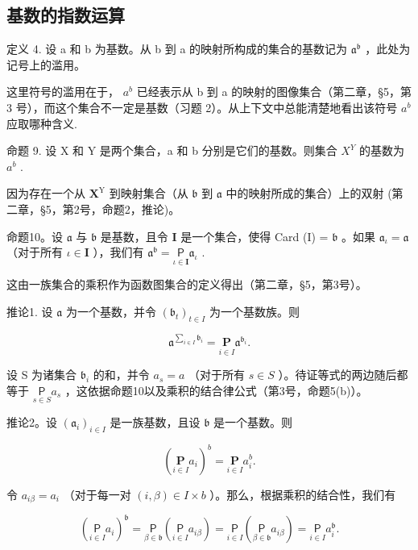 \subsection{基数的指数运算}

定义 4. 设 a 和 b 为基数。从 b 到 a 的映射所构成的集合的基数记为 \(\mathfrak{a}^{\mathfrak{b}}\) ，此处为记号上的滥用。

这里符号的滥用在于， \(a^{b}\) 已经表示从 b 到 a 的映射的图像集合（第二章，§5，第 3 号），而这个集合不一定是基数（习题 2）。从上下文中总能清楚地看出该符号 \(a^{b}\) 应取哪种含义.

命题 9. 设 X 和 Y 是两个集合，a 和 b 分别是它们的基数。则集合 \(X^{Y}\) 的基数为 \(a^{b}\) .

因为存在一个从 \(\mathbf{X}^{\mathrm{Y}}\) 到映射集合（从 \(\mathfrak{b}\) 到 \(\mathfrak{a}\) 中的映射所成的集合）上的双射 (第二章，§5，第2号，命题2，推论)。

命题10。设 \(\mathfrak{a}\) 与 \(\mathfrak{b}\) 是基数，且令 \(\mathbf{I}\) 是一个集合，使得 Card (I) = \(\mathfrak{b}\) 。如果 \(\mathfrak{a}_{\iota} = \mathfrak{a}\) （对于所有 \(\iota \in \mathbf{I}\) ），我们有 \(\mathfrak{a}^{\mathfrak{b}} = \underset{\iota \in \mathbf{I}}{\mathsf{P}}\mathfrak{a}_{\iota}\) .

这由一族集合的乘积作为函数图集合的定义得出（第二章，§5，第3号）。

推论1. 设 \(\mathfrak{a}\) 为一个基数，并令 \((\mathfrak{b}_t)_{t\in I}\) 为一个基数族。则

\[
\mathfrak{a}^{\sum_{i \in I} \mathfrak{b}_i} = \underset {i \in I} {\mathbf {P}} \mathfrak{a}^{\mathfrak{b}_i}.
\]

设 S 为诸集合 \(\mathfrak{b}_i\) 的和，并令 \(a_s = a\) （对于所有 \(s \in S\) ）。待证等式的两边随后都等于 \(\underset{s \in S}{\mathsf{P}} a_s\) ，这依据命题10以及乘积的结合律公式（第3号，命题5(b)）。

推论2。设 \((\mathfrak{a}_i)_{i\in I}\) 是一族基数，且设 \(\mathfrak{b}\) 是一个基数。则

\[
\left(\underset {i \in I} {\mathbf {P}} a _ {i}\right) ^ {b} = \underset {i \in I} {\mathbf {P}} a _ {i} ^ {b}.
\]

令 \(a_{i\beta} = a_i\) （对于每一对 \((i, \beta) \in I \times b\) ）。那么，根据乘积的结合性，我们有

\[
\left(\underset {i \in I} {\mathsf {P}} a _ {i}\right) ^ {\mathfrak {b}} = \underset {\beta \in \mathfrak {b}} {\mathsf {P}} \left(\underset {i \in I} {\mathsf {P}} a _ {i \beta}\right) = \underset {i \in I} {\mathsf {P}} \left(\underset {\beta \in \mathfrak {b}} {\mathsf {P}} a _ {i \beta}\right) = \underset {i \in I} {\mathsf {P}} a _ {i} ^ {\mathfrak {b}}.
\]

